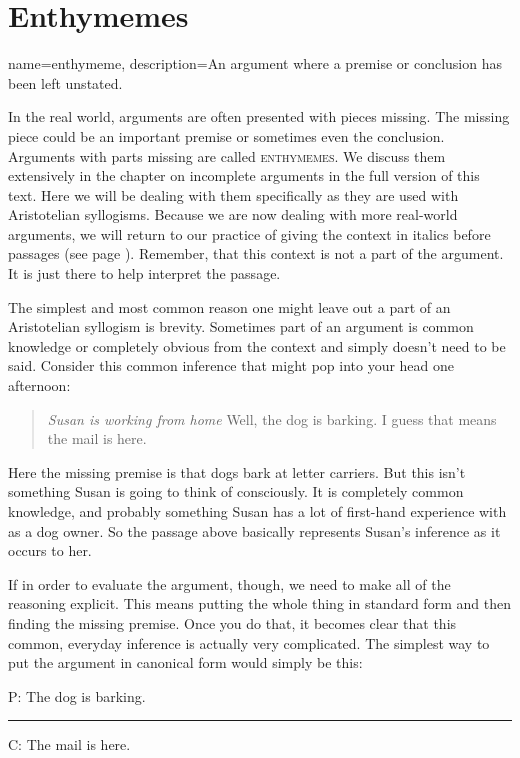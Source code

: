 \section{Enthymemes}
\label{sec:enthymemes}
{
name=enthymeme,
description={An argument where a premise or conclusion has been left unstated.}
}


In the real world, arguments are often presented with pieces missing. The missing piece could be an important premise or sometimes even the conclusion.  Arguments with parts missing are called \textsc{\glspl{enthymeme}}. \label{def:enthymeme} We discuss them extensively in the chapter on incomplete arguments in the full version of this text. \label{ver_var}  Here we will be dealing with them specifically as they are used with Aristotelian syllogisms. Because we are now dealing with more real-world arguments, we will return to our practice of giving the context in italics before passages (see page \pageref{context_marker}). Remember, that this context is not a part of the argument. It is just there to help interpret the passage. 

The simplest and most common reason one might leave out a part of an Aristotelian syllogism is brevity. Sometimes part of an argument is common knowledge or completely obvious from the context and simply doesn't need to be said. Consider this common inference that might pop into your head one afternoon:

\begin{quotation} \noindent \textit{Susan is working from home} Well, the dog is barking. I guess that means the mail is here.\end{quotation}

Here the missing premise is that dogs bark at letter carriers. But this isn't something Susan is going to think of consciously. It is completely common knowledge, and probably something Susan has a lot of first-hand experience with as a dog owner. So the passage above basically represents Susan's inference as it occurs to her. 

If in order to evaluate the argument, though, we need to make all of the reasoning explicit. This means putting the whole thing in standard form and then finding the missing premise. Once you do that, it becomes clear that this common, everyday inference is actually very complicated. The simplest way to put the argument in canonical form would simply be this:

\begin{earg}
\item[P:] The dog is barking.
\vspace{-.5em}
\item [] \rule{0.2\linewidth}{.5pt} 
\item[C:] The mail is here.
\end{earg} 

